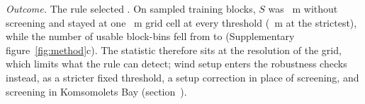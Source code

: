 \emph{Outcome.} The rule selected . On  sampled training blocks, $S$ was ~m without screening and stayed at one ~m grid cell at every threshold (~m at the strictest), while the number of usable block-bins fell from  to  (Supplementary figure~\ref{fig:method}c). The statistic therefore sits at the resolution of the grid, which limits what the rule can detect; wind setup enters the robustness checks instead, as a stricter fixed threshold, a setup correction in place of screening, and screening in Komsomolets Bay (section~\SIrobust).
